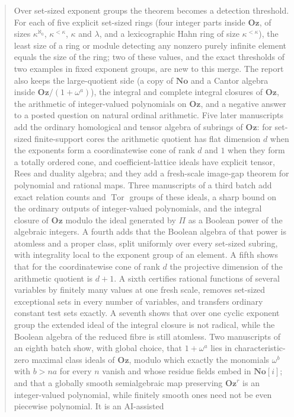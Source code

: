 \documentclass[11pt,letterpaper]{article}
\numberwithin{equation}{section}
\theoremstyle{definition}
\theoremstyle{remark}
\theoremstyle{plain}
\newcommand{\No}{\mathbf{No}}
\newcommand{\Oz}{\mathbf{Oz}}
\newcommand{\SC}{\No[i]}
\newcommand{\Tor}{\operatorname{Tor}}
\begin{document}
\begin{titlepage}
\begin{minipage}{0.9\textwidth}
\begin{abstract}
Over set-sized exponent groups the theorem becomes a detection threshold. For each of
five explicit set-sized rings (four integer parts inside $\Oz$, of sizes $\kappa^{\aleph_0}$,
$\kappa^{<\kappa}$, $\kappa$ and $\lambda$, and a lexicographic Hahn ring of size
$\kappa^{<\kappa}$), the least size of a ring
or module detecting any nonzero purely infinite element equals the size of the ring;
two of these values, and the exact thresholds of two examples in fixed exponent groups,
are new to this merge. The report also keeps the large-quotient side (a copy of $\No$ and
a Cantor algebra inside $\Oz/(1+\omega^a)$), the integral and complete integral closures
of $\Oz$, the arithmetic of integer-valued polynomials on $\Oz$, and a negative answer to a
posted question on natural ordinal arithmetic. Five later manuscripts add the ordinary
homological and tensor algebra of subrings of $\Oz$: for set-sized finite-support cores the
arithmetic quotient has flat dimension $d$ when the exponents form a coordinatewise cone of
rank $d$ and $1$ when they form a totally ordered cone, and coefficient-lattice ideals have
explicit tensor, Rees and duality algebra; and they add a fresh-scale image-gap theorem for
polynomial and rational maps. Three manuscripts of a third batch add exact relation counts and $\Tor$
groups of these ideals, a sharp bound on the ordinary outputs of integer-valued polynomials, and the
integral closure of $\Oz$ modulo the ideal generated by $\Pi$ as a Boolean power of the algebraic integers. A fourth
adds that the Boolean algebra of that power is atomless and a proper class, split uniformly over every set-sized subring,
with integrality local to the exponent group of an element. A fifth shows that for the coordinatewise cone of
rank $d$ the projective dimension of the arithmetic quotient is $d+1$. A sixth certifies rational functions of several
variables by finitely many values at one fresh scale, removes set-sized exceptional sets in every number of variables, and
transfers ordinary constant test sets exactly. A seventh shows that over one cyclic exponent group the extended ideal of
the integral closure is not radical, while the Boolean algebra of the reduced fibre is still atomless. Two manuscripts of an eighth batch
show, with global choice, that $1+\omega^a$ lies in characteristic-zero maximal class ideals of $\Oz$, modulo which exactly the monomials
$\omega^b$ with $b>na$ for every $n$ vanish and whose residue fields embed in $\SC$; and that a globally smooth semialgebraic map preserving
$\Oz^r$ is an integer-valued polynomial, while finitely smooth ones need not be even piecewise polynomial. It is an AI-assisted

\end{abstract}
\end{minipage}
\end{titlepage}
\end{document}
